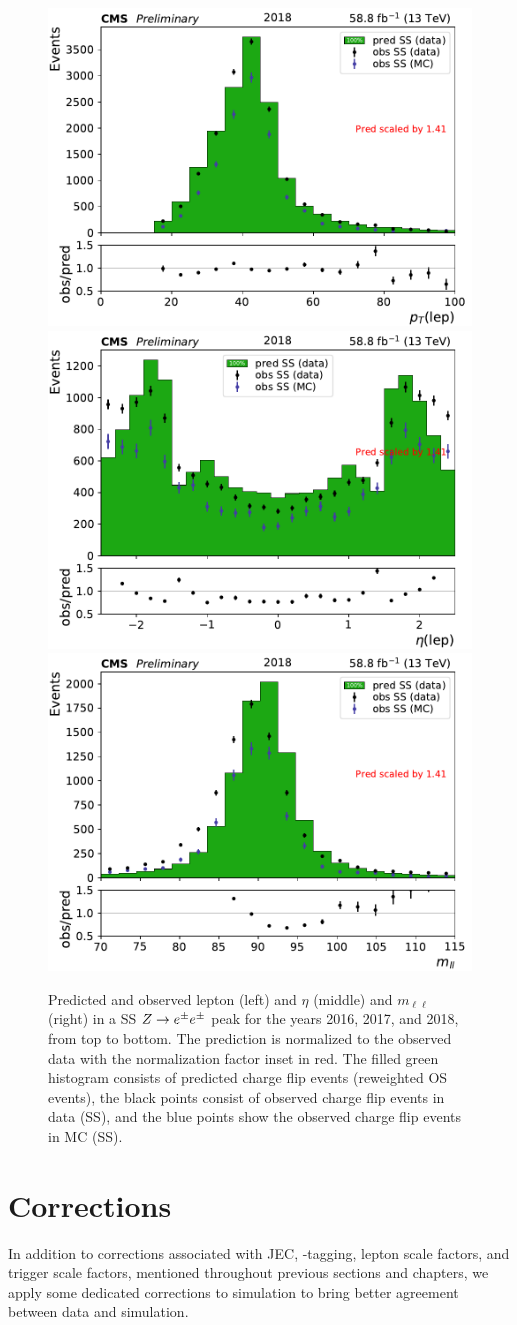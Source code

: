 \begin{figure}[!hbtp]
\includegraphics[width=.31\textwidth]{figs/ftan/flips/y2018/leppt.pdf}
\includegraphics[width=.31\textwidth]{figs/ftan/flips/y2018/lepeta.pdf}
\includegraphics[width=.31\textwidth]{figs/ftan/flips/y2018/mll.pdf} \\
    \caption{  Predicted and observed lepton \pt (left) and $\eta$ (middle) and $m_{\ell\ell}$ (right) in a SS $Z \rightarrow e^\pm e^\pm$ peak
    for the years 2016, 2017, and 2018, from top to bottom.
The prediction is normalized to the observed data with the normalization factor inset in red.
The filled green histogram consists of predicted charge flip events (reweighted OS events),
the black points consist of observed charge flip events in data (SS), and the blue points
show the observed charge flip events in MC (SS).
}
\label{fig:flipclosure}
\end{figure}

\FloatBarrier

\section{Corrections}

In addition to corrections associated with JEC, \PQb-tagging, lepton scale factors,
and trigger scale factors, mentioned throughout previous sections and chapters, we
apply some dedicated corrections to simulation to bring better agreement between data
and simulation.


